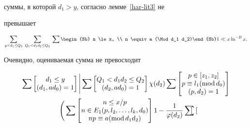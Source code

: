 суммы, в которой $d_1>y$, согласно лемме~\ref{har-lit3} не


превышает


$$


\sum_{y< d_1 \le Q_2}\; \sum_{Q_1 < d_1d_2 \le Q_2}\;


\sum\begin{Sb} n \le x, \\ n \equiv a (\Mod d_1 d_2)\end{Sb}


1\ll x \ln^{-B} x.


$$





Очевидно, оцениваемая сумма не превосходит


\begin{multline*}


\sum \begin{bmatrix}d_1 \le y\\ (d_1,ad_0)=1 \end{bmatrix}


\Bigg|


\sum \begin{bmatrix} Q_1 < d_1 d_2 \le Q_2\\ (d_2,ad_0)=1 \end{bmatrix}


\chi(d_2)


\sum


\begin{bmatrix}


p \in [z_1, z_2]\\ p\equiv l_1(\Mod d_0)\\ (p,d_2)=1


\end{bmatrix}


\\


\Bigg ( \sum


\begin{bmatrix}


n \le x/p\\


n\in E_1(p,l_2,\dotsc,l_k,d_0)\\


np \equiv a (\Mod d_1d_2)


\end{bmatrix}


1- \frac1{\varphi(d_2)} \sum 


\begin{bmatrix}



\end{bmatrix}
\end{multline*}
